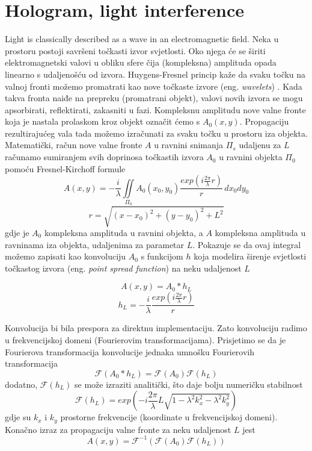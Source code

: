 \documentclass[hidelinks]{ferseminareng}
\begin{document}
	\section{Hologram, light interference}
	\label{interf}
	Light is classically described as a wave in an electromagnetic field. Neka u prostoru postoji savršeni točkasti izvor svjetlosti. Oko njega će se širiti elektromagnetski valovi u obliku sfere čija (kompleksna) amplituda opada linearno s udaljenošću od izvora. Huygens-Fresnel princip kaže da svaku točku na valnoj fronti možemo promatrati kao nove točkaste izvore (eng. \emph{wavelets}) \cite{goodman2005introduction}. Kada takva fronta naiđe na prepreku (promatrani objekt), valovi novih izvora se mogu apsorbirati, reflektirati, zakasniti u fazi. Kompleksnu amplitudu nove valne fronte koja je nastala prolaskom kroz objekt označit ćemo s $A_0(x,y)$. Propagaciju rezultirajućeg vala tada možemo izračunati za svaku točku u prostoru iza objekta. Matematički, račun nove valne fronte $A$ u ravnini snimanja $\Pi_s$ udaljenu za $L$ računamo sumiranjem svih doprinosa točkastih izvora $A_0$ u ravnini objekta $\Pi_0$ pomoću Fresnel-Kirchoff formule
	\begin{equation}
	A(x,y)=-\frac{i}{\lambda}\iint\limits_{\Pi_0}A_0(x_0,y_0)\frac{exp(i\frac{2\pi}{\lambda}r)}{r}\,dx_0dy_0
	\end{equation}
	\begin{equation}
	r = \sqrt{(x-x_0)^2+(y-y_0)^2+L^2}
	\end{equation}
	gdje je $A_0$ kompleksna amplituda u ravnini objekta, a $A$ kompleksna amplituda u ravninama iza objekta, udaljenima za parametar $L$. Pokazuje se da ovaj integral možemo zapisati kao konvoluciju $A_0$ s funkcijom $h$ koja modelira širenje svjetlosti točkastog izvora (eng. \textit{point spread function}) na neku udaljenost $L$
	
	\begin{equation}
	A(x,y)=A_0\ast h_L
	\end{equation}
	\begin{equation}
	h_L=-\frac{i}{\lambda}\frac{exp(i\frac{2\pi}{\lambda}r)}{r}
	\end{equation}
	
	Konvolucija bi bila prespora za direktnu implementaciju. Zato konvoluciju radimo u frekvencijskoj domeni (Fourierovim transformacijama). Prisjetimo se da je Fourierova transformacija konvolucije jednaka umnošku Fourierovih transformacija
	\begin{equation}
	\mathcal{F}(A_0\ast h_L)=\mathcal{F}(A_0)\mathcal{F}(h_L)
	\end{equation}
	dodatno, $\mathcal{F}(h_L)$ se može izraziti analitički, što daje bolju numeričku stabilnost
	\begin{equation}
	\label{propagator}
	\mathcal{F}(h_L)=exp(-i\frac{2\pi}{\lambda}L\sqrt{1-\lambda^2k_x^2-\lambda^2k_y^2})
	\end{equation}
	gdje su $k_x$ i $k_y$ prostorne frekvencije (koordinate u frekvencijskoj domeni). Konačno izraz za propagaciju valne fronte za neku udaljenost $L$ jest
	\begin{equation}
	\label{angspecmeth}
	A(x,y)=\mathcal{F}^{-1}(\mathcal{F}(A_0)\mathcal{F}(h_L))
	\end{equation}
	
\end{document}
